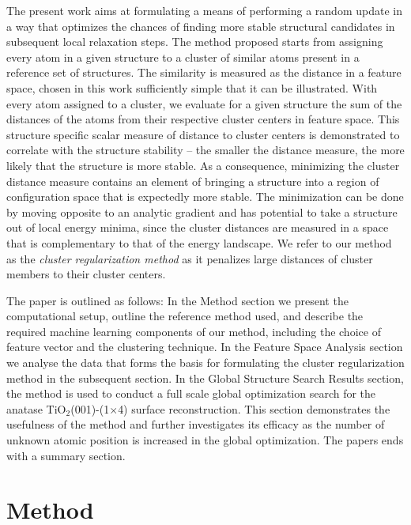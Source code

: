 \documentclass[aip,amsmath,amssymb,reprint]{revtex4-1}
\begin{document}
The present work aims at formulating a means of performing a random
update in a way that optimizes the chances of finding more stable
structural candidates in subsequent local relaxation steps. The method
proposed starts from assigning every atom in a given structure to a
cluster of similar atoms present in a reference set of structures.
The similarity is measured as the distance in a feature space, chosen in this work
sufficiently simple that it can be illustrated. With every atom
assigned to a cluster, we evaluate for a given structure the sum of
the distances of the atoms from their respective
cluster centers in feature space. This structure specific scalar measure of distance to
cluster centers is demonstrated to correlate with the structure
stability -- the smaller the distance measure, the more likely that the
structure is more stable. As a consequence, minimizing the cluster distance measure
contains an element of bringing a structure into a region of
configuration space that is expectedly more stable. The minimization
can be done by moving opposite to an analytic gradient and has
potential to take a structure out of local energy minima, since the
cluster distances are measured in a space that is complementary to that of the
energy landscape. We refer to our method as the
\textit{cluster regularization method} as it penalizes large
distances of cluster members to their cluster centers.

The paper is outlined as follows: In the Method section we present
the computational setup, outline the reference method used, and
describe the required machine learning components of our method,
including the choice of feature vector and the clustering technique.
In the Feature Space Analysis section we analyse the data that forms the basis for formulating the cluster
regularization method in the subsequent section. In the Global Structure Search Results
section, the method is used to conduct a full scale global optimization 
search for the anatase TiO$_2$(001)-(1$\times$4) surface
reconstruction.\cite{anatase2} This section demonstrates the usefulness of the method
and further investigates its efficacy as the number of unknown atomic
position is increased in the global optimization. The papers ends with a summary section.

\section{Method}
\end{document}
